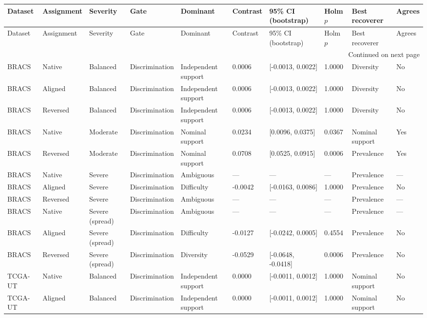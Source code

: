 \begin{longtable}{llllllllll}
\toprule
Dataset & Assignment & Severity & Gate & Dominant & Contrast & 95\% CI (bootstrap) & Holm $p$ & Best recoverer & Agrees \\
\midrule
\endfirsthead
\toprule
Dataset & Assignment & Severity & Gate & Dominant & Contrast & 95\% CI (bootstrap) & Holm $p$ & Best recoverer & Agrees \\
\midrule
\endhead
\midrule
\multicolumn{10}{r}{Continued on next page} \\
\midrule
\endfoot
\bottomrule
\endlastfoot
BRACS & Native & Balanced & Discrimination & Independent support & 0.0006 & [-0.0013, 0.0022] & 1.0000 & Diversity & No \\
BRACS & Aligned & Balanced & Discrimination & Independent support & 0.0006 & [-0.0013, 0.0022] & 1.0000 & Diversity & No \\
BRACS & Reversed & Balanced & Discrimination & Independent support & 0.0006 & [-0.0013, 0.0022] & 1.0000 & Diversity & No \\
BRACS & Native & Moderate & Discrimination & Nominal support & 0.0234 & [0.0096, 0.0375] & 0.0367 & Nominal support & Yes \\
BRACS & Reversed & Moderate & Discrimination & Nominal support & 0.0708 & [0.0525, 0.0915] & 0.0006 & Prevalence & Yes \\
BRACS & Native & Severe & Discrimination & Ambiguous & --- & --- & --- & Prevalence & --- \\
BRACS & Aligned & Severe & Discrimination & Difficulty & -0.0042 & [-0.0163, 0.0086] & 1.0000 & Prevalence & No \\
BRACS & Reversed & Severe & Discrimination & Ambiguous & --- & --- & --- & Prevalence & --- \\
BRACS & Native & Severe (spread) & Discrimination & Ambiguous & --- & --- & --- & Prevalence & --- \\
BRACS & Aligned & Severe (spread) & Discrimination & Difficulty & -0.0127 & [-0.0242, 0.0005] & 0.4554 & Prevalence & No \\
BRACS & Reversed & Severe (spread) & Discrimination & Diversity & -0.0529 & [-0.0648, -0.0418] & 0.0006 & Prevalence & No \\
TCGA-UT & Native & Balanced & Discrimination & Independent support & 0.0000 & [-0.0011, 0.0012] & 1.0000 & Nominal support & No \\
TCGA-UT & Aligned & Balanced & Discrimination & Independent support & 0.0000 & [-0.0011, 0.0012] & 1.0000 & Nominal support & No \\

\end{longtable}
